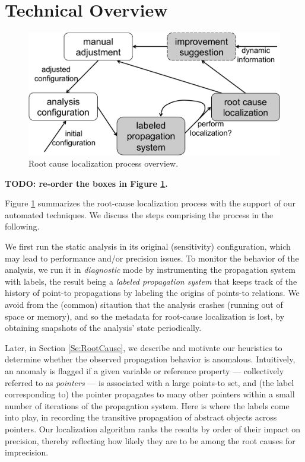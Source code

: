 \section{Technical Overview}
\label{design}

\begin{figure}[th!]
        \includegraphics[width=0.9\columnwidth]{overview}
\caption{\textmd{Root cause localization process overview.}}
\label{fig:overview}
\end{figure}


{\bf TODO: re-order the boxes in Figure \ref{fig:overview}.}

Figure \ref{fig:overview} summarizes the root-cause localization process with the support of our automated techniques. We discuss the steps comprising the process in the following.

We first run the static analysis in its original (sensitivity) configuration, which may lead to performance and/or precision issues. To monitor the behavior of the analysis, we run it in \emph{diagnostic} mode by instrumenting the propagation system with labels, the result being a \emph{labeled propagation system} that keeps track of the history of point-to propagations by labeling the origins of points-to relations. We avoid from the (common) sitaution that the analysis crashes (running out of space or memory), and so the metadata for root-cause localization is lost, by obtaining snapshots of the analysis' state periodically.

Later, in Section \ref{Se:RootCause}, we describe and motivate our heuristics to determine whether the observed propagation behavior is anomalous. Intuitively, an anomaly is flagged if a given variable or reference property --- collectively referred to as \emph{pointers} --- is associated with a large points-to set, and (the label corresponding to) the pointer propagates to many other pointers within a small number of iterations of the propagation system. Here is where the labels come into play, in recording the transitive propagation of abstract objects across pointers. Our localization algorithm ranks the results by order of their impact on precision, thereby reflecting how likely they are to be among the root causes for imprecision.


